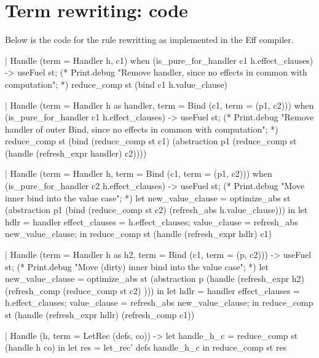 \section{Term rewriting: code}
\label{code}
Below is the code for the rule rewritting as implemented in the Eff compiler.
\begin{efflisting}[breaklines=true]
  | Handle ({term = Handler h}, c1)
        when (is_pure_for_handler c1 h.effect_clauses) ->
    useFuel st;
    (* Print.debug "Remove handler, since no effects in common with computation"; *)
    reduce_comp st (bind c1 h.value_clause)

  | Handle ({term = Handler h} as handler, {term = Bind (c1, {term = (p1, c2)})})
        when (is_pure_for_handler c1 h.effect_clauses) ->
    useFuel st;
    (* Print.debug "Remove handler of outer Bind, since no effects in common with computation"; *)
    reduce_comp st (bind (reduce_comp st c1) (abstraction p1 (reduce_comp st (handle (refresh_expr handler) c2))))

  | Handle ({term = Handler h}, {term = Bind (c1, {term = (p1, c2)})})
        when (is_pure_for_handler c2 h.effect_clauses) ->
    useFuel st;
    (* Print.debug "Move inner bind into the value case"; *)
    let new_value_clause = optimize_abs st (abstraction p1 (bind (reduce_comp st c2) (refresh_abs h.value_clause))) in
    let hdlr = handler {
      effect_clauses = h.effect_clauses;
      value_clause = refresh_abs new_value_clause;
    } in
    reduce_comp st (handle (refresh_expr hdlr) c1)

  | Handle ({term = Handler h} as h2, {term = Bind (c1, {term = (p, c2)})}) ->
    useFuel st;
    (* Print.debug "Move (dirty) inner bind into the value case"; *)
    let new_value_clause = optimize_abs st (abstraction p (handle (refresh_expr h2) (refresh_comp (reduce_comp st c2) ))) in
    let hdlr = handler {
      effect_clauses = h.effect_clauses;
      value_clause = refresh_abs new_value_clause;
    } in
    reduce_comp st (handle (refresh_expr hdlr) (refresh_comp c1))
    
  | Handle (h, {term = LetRec (defs, co)}) ->
  let handle_h_c = reduce_comp st (handle h co) in
  let res =
    let_rec' defs handle_h_c
  in
  reduce_comp st res
\end{efflisting}